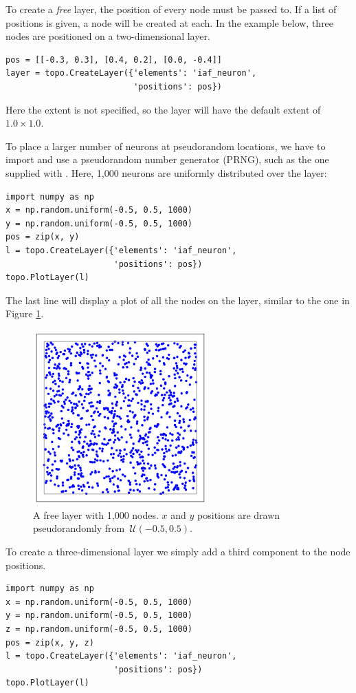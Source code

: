 To create a \emph{free} layer, the position of every node must be passed to\linebreak {}. If a list of positions is given, a node will be created at each. In the example below, three nodes are positioned on a two-dimensional layer. 
\begin{lstlisting}
pos = [[-0.3, 0.3], [0.4, 0.2], [0.0, -0.4]]
layer = topo.CreateLayer({'elements': 'iaf_neuron', 
                          'positions': pos})
\end{lstlisting}
Here the extent is not specified, so the layer will have the default extent of $1.0 \times 1.0$. 

To place a larger number of neurons at pseudorandom locations, we have to import and use a pseudorandom number generator (PRNG), such as the one supplied with . Here, 1,000 neurons are uniformly distributed over the layer:
\begin{lstlisting}
import numpy as np
x = np.random.uniform(-0.5, 0.5, 1000)
y = np.random.uniform(-0.5, 0.5, 1000)
pos = zip(x, y)
l = topo.CreateLayer({'elements': 'iaf_neuron', 
                      'positions': pos})
topo.PlotLayer(l)
\end{lstlisting}
The last line will display a plot of all the nodes on the layer, similar to the one in Figure \ref{fig:free_layer}.
\begin{figure}[h]
  \centering
  \includegraphics[width=0.6\textwidth]{FreeLayer.pdf}
  \caption[Example of free two-dimensional layer]{A free layer with 1,000 nodes. $x$ and $y$ positions are drawn pseudorandomly from~$\mathcal{U}(-0.5, 0.5)$.}
  \label{fig:free_layer}
\end{figure}
To create a three-dimensional layer we simply add a third component to the node positions.
\begin{lstlisting}
import numpy as np
x = np.random.uniform(-0.5, 0.5, 1000)
y = np.random.uniform(-0.5, 0.5, 1000)
z = np.random.uniform(-0.5, 0.5, 1000)
pos = zip(x, y, z)
l = topo.CreateLayer({'elements': 'iaf_neuron', 
                      'positions': pos})
topo.PlotLayer(l)
\end{lstlisting}
